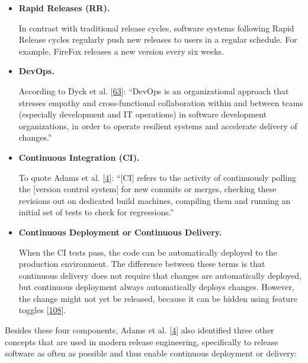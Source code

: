 \documentclass[]{book}
\begin{document}
\begin{itemize}
\item
  \textbf{Rapid Releases (RR).}

  In contrast with traditional release cycles, software systems
  following Rapid Release cycles regularly push new releases to users in
  a regular schedule. For example, FireFox releases a new version every
  six weeks.
\item
  \textbf{DevOps.}

  According to Dyck et al. {[}\protect\hyperlink{ref-dyck2015a}{63}{]}:
  ``DevOps is an organizational approach that stresses empathy and
  cross-functional collaboration within and between teams (especially
  development and IT operations) in software development organizations,
  in order to operate resilient systems and accelerate delivery of
  changes.''
\item
  \textbf{Continuous Integration (CI).}

  To quote Adams et al. {[}\protect\hyperlink{ref-adams2016a}{4}{]}:
  ``{[}CI{]} refers to the activity of continuously polling the
  {[}version control system{]} for new commits or merges, checking these
  revisions out on dedicated build machines, compiling them and running
  an initial set of tests to check for regressions.''
\item
  \textbf{Continuous Deployment or Continuous Delivery.}

  When the CI tests pass, the code can be automatically deployed to the
  production environment. The difference between these terms is that
  continuous delivery does not require that changes are automatically
  deployed, but continuous deployment always automatically deploys
  changes. However, the change might not yet be released, because it can
  be hidden using feature toggles
  {[}\protect\hyperlink{ref-laukkanen2018a}{108}{]}.
\end{itemize}

Besides these four components, Adams et al.
{[}\protect\hyperlink{ref-adams2016a}{4}{]} also identified three other
concepts that are used in modern release engineering, specifically to
release software as often as possible and thus enable continuous
deployment or delivery:
\end{document}
